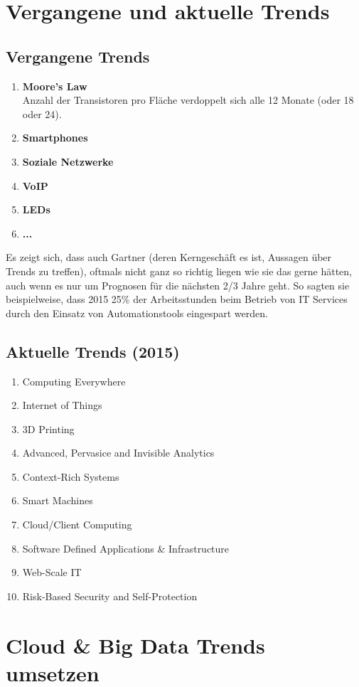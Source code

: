\section{Vergangene und aktuelle Trends}
\subsection{Vergangene Trends}
\begin{enumerate}
	\item \textbf{Moore's Law} \\
		Anzahl der Transistoren pro Fläche verdoppelt sich alle 12 Monate (oder 18 oder 24).
	\item \textbf{Smartphones}
	\item \textbf{Soziale Netzwerke}
	\item \textbf{VoIP}
	\item \textbf{LEDs}
	\item \textbf{...}
\end{enumerate}
Es zeigt sich, dass auch Gartner (deren Kerngeschäft es ist, Aussagen über Trends zu treffen), oftmals nicht ganz so richtig liegen wie sie das gerne hätten, auch wenn es nur um Prognosen für die nächsten 2/3 Jahre geht. So sagten sie beispielweise, dass 2015 25\% der Arbeitsstunden beim Betrieb von IT Services durch den Einsatz von Automationstools eingespart werden.
\subsection{Aktuelle Trends (2015)}
\begin{enumerate}
	\item Computing Everywhere
	\item Internet of Things
	\item 3D Printing
	\item Advanced, Pervasice and Invisible Analytics
	\item Context-Rich Systems
	\item Smart Machines
	\item Cloud/Client Computing
	\item Software Defined Applications \& Infrastructure
	\item Web-Scale IT
	\item Risk-Based Security and Self-Protection
\end{enumerate}
\section{Cloud \& Big Data Trends umsetzen}
